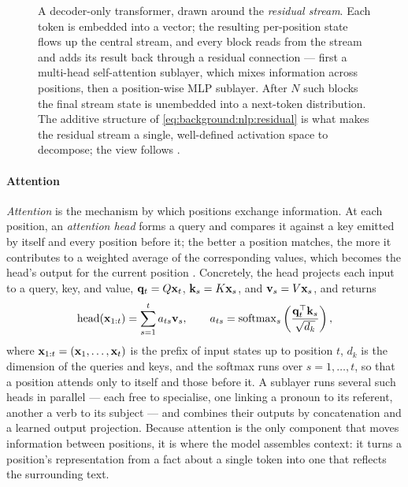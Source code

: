 \begin{figure}[tb]
    \caption[A decoder-only transformer drawn around the residual stream]{
        A decoder-only transformer, drawn around the \textit{residual stream}.
        Each token is embedded into a vector; the resulting per-position state
        flows up the central stream, and every block reads from the stream and
        adds its result back through a residual connection --- first a
        multi-head self-attention sublayer, which mixes information across
        positions, then a position-wise \acs{MLP} sublayer. After $N$ such
        blocks the final stream state is unembedded into a next-token
        distribution. The additive structure of
        \cref{eq:background:nlp:residual} is what makes the
        residual stream a single, well-defined activation space to decompose;
        the view follows \citet{elhageMathematicalFrameworkTransformer2021}.
    }
    \label{fig:transformer-block}
\end{figure}

    \paragraph{Attention} \textit{Attention} is the mechanism by which positions
    exchange information. At each position, an \textit{attention head} forms a
    query and compares it against a key emitted by itself and every position
    before it; the better a position matches, the more it contributes to a
    weighted average of the corresponding values, which becomes the head's
    output for the current position \citep{vaswaniAttentionAllYou2017}.
    Concretely, the head projects each input to a query, key, and value,
    $\vb{q}_t = Q \vb{x}_t$, $\vb{k}_s = K \vb{x}_s$, and $\vb{v}_s = V
    \vb{x}_s$, and returns
    \begin{equation} \label{eq:background:nlp:attention}
        \operatorname{head}(\vb{x}_{1:t}) = \sum_{s=1}^{t} a_{ts} \vb{v}_s, \qquad
        a_{ts} = \operatorname{softmax}_{s}\left(
        \frac{\vb{q}_t^{\top} \vb{k}_s}{\sqrt{d_k}}\right),
    \end{equation}
    where $\vb{x}_{1:t} = (\vb{x}_{1}, \dots, \vb{x}_{t})$ is the prefix of
    input states up to position $t$, $d_k$ is the dimension of the queries and
    keys, and the softmax runs over $s = 1, \dots, t$, so that a position
    attends only to itself and those before it. A sublayer runs several such
    heads in parallel --- each free to specialise, one linking a pronoun to its
    referent, another a verb to its subject --- and combines their outputs by
    concatenation and a learned output projection. Because attention is the only
    component that moves information between positions, it is where the model
    assembles context: it turns a position's representation from a fact about a
    single token into one that reflects the surrounding text.

